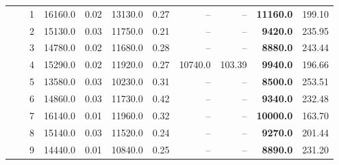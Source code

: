 {\begin{longtable}{ccc|rr|rr|rr|rr}
 &  & 1 & 16160.0 & 0.02 & 13130.0 & 0.27 & -- & -- & \textbf{11160.0} & 199.10 \\
 &  & 2 & 15130.0 & 0.03 & 11750.0 & 0.21 & -- & -- & \textbf{9420.0} & 235.95 \\
 &  & 3 & 14780.0 & 0.02 & 11680.0 & 0.28 & -- & -- & \textbf{8880.0} & 243.44 \\
 &  & 4 & 15290.0 & 0.02 & 11920.0 & 0.27 & 10740.0 & 103.39 & \textbf{9940.0} & 196.66 \\
 &  & 5 & 13580.0 & 0.03 & 10230.0 & 0.31 & -- & -- & \textbf{8500.0} & 253.51 \\
 &  & 6 & 14860.0 & 0.03 & 11730.0 & 0.42 & -- & -- & \textbf{9340.0} & 232.48 \\
 &  & 7 & 16140.0 & 0.01 & 11960.0 & 0.32 & -- & -- & \textbf{10000.0} & 163.70 \\
 &  & 8 & 15140.0 & 0.03 & 11520.0 & 0.24 & -- & -- & \textbf{9270.0} & 201.44 \\
 &  & 9 & 14440.0 & 0.01 & 10840.0 & 0.25 & -- & -- & \textbf{8890.0} & 231.20 \\
\end{longtable}

}
